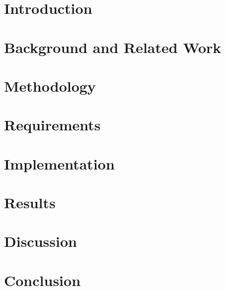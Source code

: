 



\newpage

\newpage


\clearpage

\tableofcontents
\listoffigures
\listoftables
\lstlistoflistings

\newpage

\chapter{Introduction}


\chapter{Background and Related Work}


\chapter{Methodology}


\chapter{Requirements}


\chapter{Implementation}


\chapter{Results}


\chapter{Discussion}


\chapter{Conclusion}






